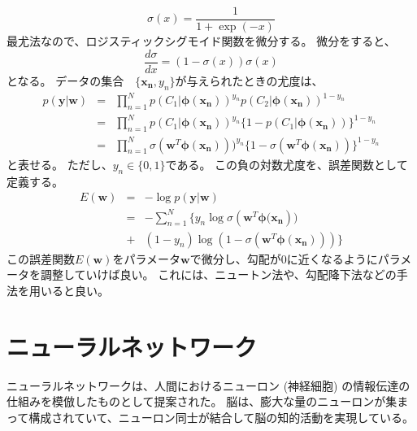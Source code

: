 \documentclass[titlepage,12pt]{jreport}
\begin{document}
\begin{equation}
	\label{eq:logistic_sigmoid}
	\sigma(x) = \frac{1}{1 + \exp(-x)}
\end{equation}
最尤法なので、ロジスティックシグモイド関数を微分する。 微分をすると、
\begin{equation}
	\frac{d\sigma}{dx} = (1 - \sigma(x))\sigma(x)
\end{equation}
となる。
データの集合　$\{\bm{x_n}, y_n\}$が与えられたときの尤度は、
\begin{eqnarray}
	p(\bm{y}|\bm{w}) &=& \prod_{n = 1}^{N}p(C_1|\bm{\phi(x_n)})^{y_n}p(C_2|\bm{\phi(x_n)})^{1 - y_n}  \nonumber \\
	&=& \prod_{n = 1}^{N} p(C_1|\bm{\phi(x_n)})^{y_n}\{1 - p(C_1|\bm{\phi(x_n)})\}^{1 - y_n} \nonumber \\
	&=& \prod_{n = 1}^{N} \sigma(\bm{w}^{T}\bm{\phi(x_n)}))^{y_n}\{1 - \sigma(\bm{w}^{T}\bm{\phi(x_n)})\}^{1 - y_n}
\end{eqnarray}
と表せる。 ただし、$y_n \in \{0, 1\}$である。 この負の対数尤度を、誤差関数として定義する。
\begin{eqnarray}
	E(\bm{w}) &=& -\log p(\bm{y}|\bm{w}) \nonumber \\
	&=& -\sum_{n = 1}^{N} \{y_n \log \sigma(\bm{w}^{T} \bm{\phi(x_n})) \nonumber \\
	&+& (1 - y_n) \log(1 - \sigma(\bm{w}^{T}\bm{\phi(x_n)}))\}
\end{eqnarray}
この誤差関数$E(\bm{w})$をパラメータ$\bm{w}$で微分し、勾配が0に近くなるようにパラメータを調整していけば良い。 これには、ニュートン法や、勾配降下法などの手法を用いると良い。

\section{ニューラルネットワーク}
ニューラルネットワークは、人間におけるニューロン (神経細胞) の情報伝達の仕組みを模倣したものとして提案された。 脳は、膨大な量のニューロンが集まって構成されていて、ニューロン同士が結合して脳の知的活動を実現している。
\end{document}
